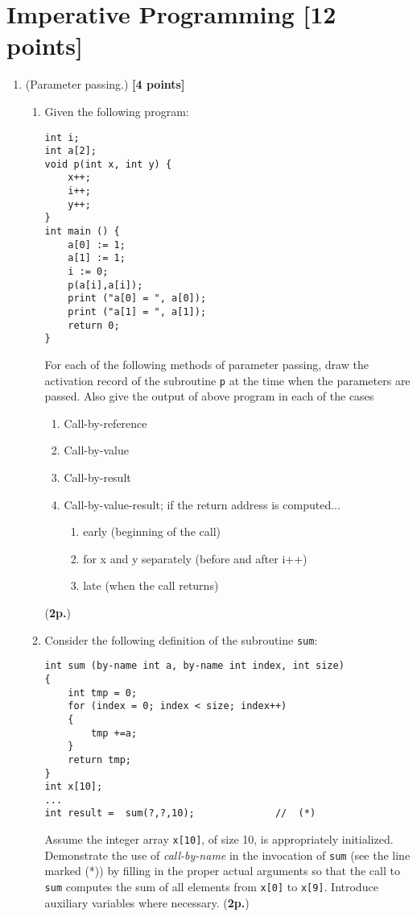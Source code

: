 \documentclass{article}
\begin{document}
\section{Imperative Programming [12 points]}

\begin{enumerate}
\item (Parameter passing.) 
\hfill{\textbf{[4 points]}}
\begin{enumerate}
\item Given  the following program:

{\small
\begin{verbatim}
int i;
int a[2];
void p(int x, int y) {
    x++;
    i++;
    y++;
}
int main () {
    a[0] := 1;
    a[1] := 1;
    i := 0;
    p(a[i],a[i]);
    print ("a[0] = ", a[0]);
    print ("a[1] = ", a[1]);
    return 0;
}
\end{verbatim}
}

For each of the following methods of parameter passing,
draw the activation record of the subroutine \texttt{p} at the time when
the parameters are passed. Also give the output of above program
in each of the cases

\begin{enumerate}\itemsep=0.0cm
\item Call-by-reference
\item Call-by-value
\item Call-by-result
\item Call-by-value-result; if the return address is computed...
\begin{enumerate}\itemsep=0.0cm
\item early (beginning of the call)
\item for x and y separately (before and after i++)
\item late (when the call returns)
\end{enumerate}
\end{enumerate}
 (\textbf{2p.})
\item Consider the following definition of the 
subroutine \texttt{sum}: 

{\small 
\begin{verbatim}
int sum (by-name int a, by-name int index, int size)
{
    int tmp = 0;
    for (index = 0; index < size; index++)
    {
        tmp +=a;
    }
    return tmp;
}
int x[10];
...
int result =  sum(?,?,10);              //  (*)   
\end{verbatim}
}
 Assume the integer array \texttt{x[10]}, of size 10, is appropriately
initialized. Demonstrate the use of \textit{call-by-name} in the invocation of
\texttt{sum} (see the line marked (*)) by filling in the
proper actual arguments so that the call to \texttt{sum} computes
the sum of all elements from \texttt{x[0]} to \texttt{x[9]}. 
Introduce auxiliary variables where necessary. (\textbf{2p.})
\\
\end{enumerate} 


\end{enumerate}
\end{document}
